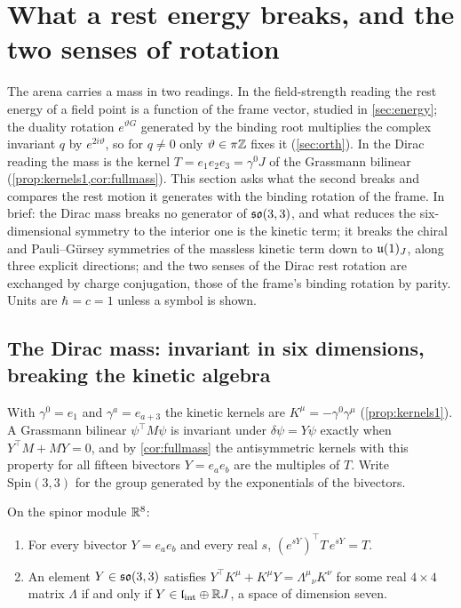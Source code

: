 \section{What a rest energy breaks, and the two senses of rotation}
\label{sec:massbreaks}

The arena carries a mass in two readings. In the field-strength reading the rest energy of a field point is a function of the frame
vector, studied in \cref{sec:energy}; the duality rotation $e^{\vartheta G}$ generated by the binding root multiplies the complex
invariant $q$ by $e^{2i\vartheta}$, so for $q\neq0$ only $\vartheta\in\pi\mathbb{Z}$ fixes it (\cref{sec:orth}). In the Dirac reading the mass is
the kernel $T=e_1e_2e_3=\gamma^0J$ of the Grassmann bilinear (\cref{prop:kernels1,cor:fullmass}). This section asks what the second
breaks and compares the rest motion it generates with the binding rotation of the frame. In brief: the Dirac mass breaks no generator
of $\mathfrak{so}(3,3)$, and what reduces the six-dimensional symmetry to the interior one is the kinetic term; it breaks the chiral and
Pauli--G\"ursey symmetries of the massless kinetic term down to $\mathfrak{u}(1)_J$, along three explicit directions; and the two senses of the
Dirac rest rotation are exchanged by charge conjugation, those of the frame's binding rotation by parity. Units are $\hbar=c=1$ unless
a symbol is shown.

\subsection{The Dirac mass: invariant in six dimensions, breaking the kinetic algebra}
\label{sec:massdirac}

With $\gamma^0=e_1$ and $\gamma^a=e_{a+3}$ the kinetic kernels are $K^\mu=-\gamma^0\gamma^\mu$ (\cref{prop:kernels1}). A Grassmann bilinear
$\psi^{\!\top}M\psi$ is invariant under $\delta\psi=Y\psi$ exactly when $Y^{\!\top}M+MY=0$, and by \cref{cor:fullmass} the antisymmetric
kernels with this property for all fifteen bivectors $Y=e_ae_b$ are the multiples of $T$. Write $\mathrm{Spin}(3,3)$ for the group
generated by the exponentials of the bivectors.

\begin{proposition}
\label{mb:Tinv}
On the spinor module $\mathbb{R}^8$:
\begin{enumerate}[label=(\roman*),leftmargin=2.2em]
\item For every bivector $Y=e_ae_b$ and every real $s$, $(e^{sY})^{\!\top}T\,e^{sY}=T$.
\item An element $Y\in\mathfrak{so}(3,3)$ satisfies $Y^{\!\top}K^\mu+K^\mu Y=\Lambda^\mu{}_\nu K^\nu$ for some real $4\times4$ matrix $\Lambda$ if and only if
$Y\in\mathfrak l_{\rm int}\oplus\mathbb{R} J$, a space of dimension seven.
\end{enumerate}
\end{proposition}

